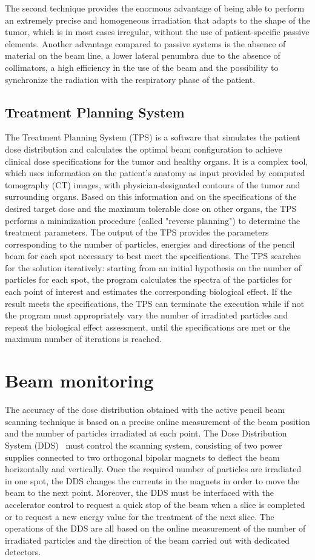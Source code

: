 \noindent The second technique provides the enormous advantage of being able to perform an extremely precise and homogeneous irradiation that adapts to the shape of the tumor, which is in most cases irregular, without the use of patient-specific passive elements.
Another advantage compared to passive systems is the absence of material on the beam line, a lower lateral penumbra due to the absence of collimators, a high efficiency in the use of the beam and the possibility to synchronize the radiation with the respiratory phase of the patient.

\subsection{Treatment Planning System}
\noindent The Treatment Planning System (TPS) is a software that simulates the patient dose distribution and calculates the optimal beam configuration to achieve clinical dose specifications for the tumor and healthy organs.
It is a complex tool, which uses information on the patient's anatomy as input provided by computed tomography (CT) images, with physician-designated contours of the tumor and surrounding organs.
Based on this information and on the specifications of the desired target dose and the maximum tolerable dose on other organs, the TPS performs a minimization procedure (called "reverse planning") to determine the treatment parameters.
The output of the TPS provides the parameters corresponding to the number of particles, energies and directions of the pencil beam for each spot necessary to best meet the specifications.
The TPS searches for the solution iteratively: starting from an initial hypothesis on the number of particles for each spot, the program calculates the spectra of the particles for each point of interest and estimates the corresponding biological effect.
If the result meets the specifications, the TPS can terminate the execution while if not the program must appropriately vary the number of irradiated particles and repeat the biological effect assessment, until the specifications are met or the maximum number of iterations is reached.


\section{Beam monitoring}
\noindent The accuracy of the dose distribution obtained with the active pencil beam scanning technique is based on a precise online measurement of the beam position and the number of particles irradiated at each point.
The Dose Distribution System (DDS)~\cite{pencil} must control the scanning system, consisting of two power supplies connected to two orthogonal bipolar magnets to deflect the beam horizontally and vertically.
Once the required number of particles are irradiated in one spot, the DDS changes the currents in the magnets in order to move the beam to the next point.
Moreover, the DDS must be interfaced with the accelerator control to request a quick stop of the beam when a slice is completed or to request a new energy value for the treatment of the next slice.
The operations of the DDS are all based on the online measurement of the number of irradiated particles and the direction of the beam carried out with dedicated detectors.
